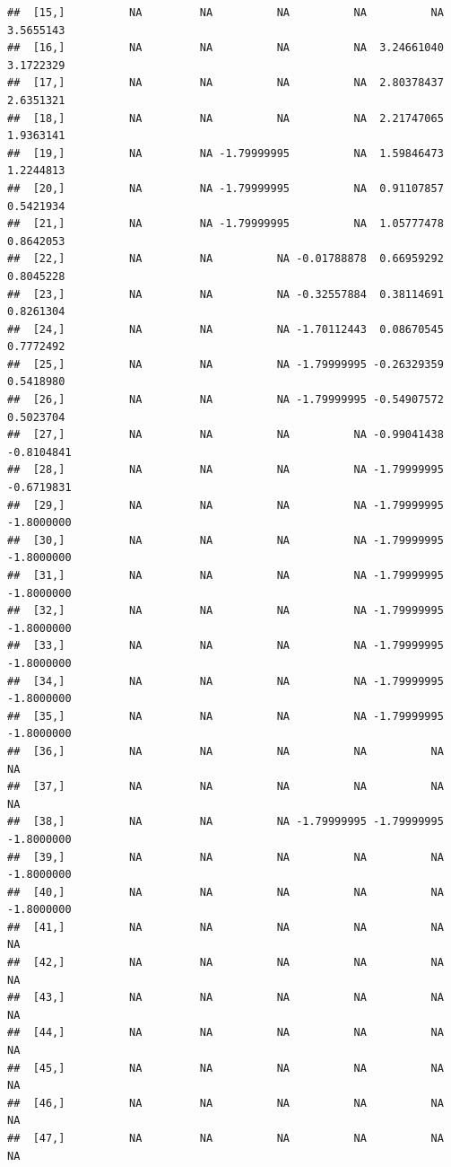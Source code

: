 \documentclass{article}\usepackage[]{graphicx}\usepackage[]{color}
\makeatletter
\newenvironment{kframe}{%
 \def\at@end@of@kframe{}%
 \ifinner\ifhmode%
  \def\at@end@of@kframe{\end{minipage}}%
  \begin{minipage}{\columnwidth}%
 \fi\fi%
 \def\FrameCommand##1{\hskip\@totalleftmargin \hskip-\fboxsep
 \colorbox{shadecolor}{##1}\hskip-\fboxsep
     \hskip-\linewidth \hskip-\@totalleftmargin \hskip\columnwidth}%
 \MakeFramed {\advance\hsize-\width
   \@totalleftmargin\z@ \linewidth\hsize
   \@setminipage}}%
 {\par\unskip\endMakeFramed%
 \at@end@of@kframe}
\newenvironment{knitrout}{}{} %
\makeatother
\begin{document}
\begin{knitrout}
\begin{kframe}
\begin{verbatim}
##  [15,]          NA         NA          NA          NA          NA  3.5655143
##  [16,]          NA         NA          NA          NA  3.24661040  3.1722329
##  [17,]          NA         NA          NA          NA  2.80378437  2.6351321
##  [18,]          NA         NA          NA          NA  2.21747065  1.9363141
##  [19,]          NA         NA -1.79999995          NA  1.59846473  1.2244813
##  [20,]          NA         NA -1.79999995          NA  0.91107857  0.5421934
##  [21,]          NA         NA -1.79999995          NA  1.05777478  0.8642053
##  [22,]          NA         NA          NA -0.01788878  0.66959292  0.8045228
##  [23,]          NA         NA          NA -0.32557884  0.38114691  0.8261304
##  [24,]          NA         NA          NA -1.70112443  0.08670545  0.7772492
##  [25,]          NA         NA          NA -1.79999995 -0.26329359  0.5418980
##  [26,]          NA         NA          NA -1.79999995 -0.54907572  0.5023704
##  [27,]          NA         NA          NA          NA -0.99041438 -0.8104841
##  [28,]          NA         NA          NA          NA -1.79999995 -0.6719831
##  [29,]          NA         NA          NA          NA -1.79999995 -1.8000000
##  [30,]          NA         NA          NA          NA -1.79999995 -1.8000000
##  [31,]          NA         NA          NA          NA -1.79999995 -1.8000000
##  [32,]          NA         NA          NA          NA -1.79999995 -1.8000000
##  [33,]          NA         NA          NA          NA -1.79999995 -1.8000000
##  [34,]          NA         NA          NA          NA -1.79999995 -1.8000000
##  [35,]          NA         NA          NA          NA -1.79999995 -1.8000000
##  [36,]          NA         NA          NA          NA          NA         NA
##  [37,]          NA         NA          NA          NA          NA         NA
##  [38,]          NA         NA          NA -1.79999995 -1.79999995 -1.8000000
##  [39,]          NA         NA          NA          NA          NA -1.8000000
##  [40,]          NA         NA          NA          NA          NA -1.8000000
##  [41,]          NA         NA          NA          NA          NA         NA
##  [42,]          NA         NA          NA          NA          NA         NA
##  [43,]          NA         NA          NA          NA          NA         NA
##  [44,]          NA         NA          NA          NA          NA         NA
##  [45,]          NA         NA          NA          NA          NA         NA
##  [46,]          NA         NA          NA          NA          NA         NA
##  [47,]          NA         NA          NA          NA          NA         NA

\end{verbatim}
\end{kframe}
\end{knitrout}
\end{document}
